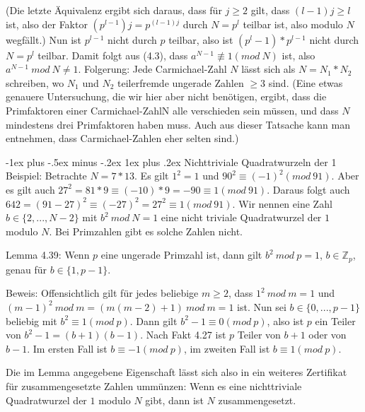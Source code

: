 \documentclass[a4paper]{article}
\makeatletter
\renewcommand{\subsubsection}{\@startsection{subsubsection}{3}{0mm}%
 {-1ex plus -.5ex minus -.2ex}%
 {1ex plus .2ex}%
 {\normalfont\small\bfseries}}
\makeatother
\begin{document}
\begin{multicols}{3}
        (Die letzte Äquivalenz ergibt sich daraus, dass für $j\geq 2$ gilt, dass $(l-1)j\geq l$ ist, also der Faktor $(p^{l-1})j=p^{(l-1)j}$ durch $N=p^l$ teilbar ist, also modulo $N$ wegfällt.) Nun ist $p^{l-1}$ nicht durch $p$ teilbar, also ist $(p^l-1)*p^{l-1}$ nicht durch $N=p^l$ teilbar. Damit folgt aus (4.3), dass $a^{N-1}\not\equiv 1 (mod\ N)$ ist, also $a^{N-1}\ mod\ N\not= 1$.
        Folgerung: Jede Carmichael-Zahl $N$ lässt sich als $N=N_1 *N_2$ schreiben, wo $N_1$ und $N_2$ teilerfremde ungerade Zahlen $\geq 3$ sind.
        (Eine etwas genauere Untersuchung, die wir hier aber nicht benötigen, ergibt, dass die Primfaktoren einer Carmichael-ZahlN alle verschieden sein müssen, und dass $N$ mindestens drei Primfaktoren haben muss. Auch aus dieser Tatsache kann man entnehmen, dass Carmichael-Zahlen eher selten sind.)

        \subsubsection{Nichttriviale Quadratwurzeln der 1}
        Beispiel: Betrachte $N=7*13$. Es gilt $1^2 = 1$ und $90^2 \equiv(-1)^2 (mod\ 91)$. Aber es gilt auch $27^2 = 81* 9 \equiv(-10)*9 = -90\equiv 1(mod\ 91)$. Daraus folgt auch
    $642 =(91-27)^2 \equiv (-27)^2 = 27^2 \equiv 1 (mod\ 91)$. Wir nennen eine Zahl $b\in\{2,...,N-2\}$ mit $b^2\ mod\ N=1$ eine nicht triviale Quadratwurzel der $1$ modulo $N$. Bei Primzahlen gibt es solche Zahlen nicht.

        Lemma 4.39: Wenn $p$ eine ungerade Primzahl ist, dann gilt $b^2\ mod\ p = 1$, $b \in\mathbb{Z}_p$, genau für $b\in\{1 ,p-1\}$.

        Beweis: Offensichtlich gilt für jedes beliebige $m\geq 2$, dass $1^2\ mod\ m= 1$ und $(m-1)^2\ mod\ m= (m(m-2)+1)\ mod\ m= 1$ ist. Nun sei $b\in\{0 ,...,p-1\}$ beliebig mit $b^2\equiv 1(mod\ p)$. Dann gilt $b^2-1 \equiv 0 (mod\ p)$, also ist $p$ ein Teiler von $b^2-1 =(b+1)(b-1)$. Nach Fakt 4.27 ist $p$ Teiler von $b+1$ oder von $b-1$. Im ersten Fall ist $b\equiv -1 (mod\ p)$, im zweiten Fall ist $b\equiv 1(mod\ p)$.

        Die im Lemma angegebene Eigenschaft lässt sich also in ein weiteres Zertifikat für zusammengesetzte Zahlen ummünzen:
        Wenn es eine nichttriviale Quadratwurzel der $1$ modulo $N$ gibt, dann ist $N$ zusammengesetzt.


\end{multicols}
\end{document}
